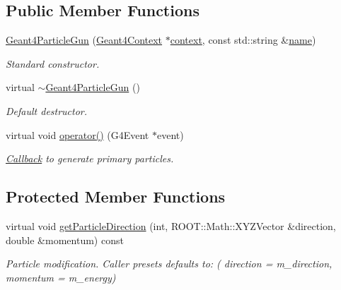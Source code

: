 \subsection*{Public Member Functions}
\begin{DoxyCompactItemize}
\item 
\hyperlink{class_d_d4hep_1_1_simulation_1_1_geant4_particle_gun_ae5bb5f3dd378bc79d03bff0fc723c46d}{Geant4\+Particle\+Gun} (\hyperlink{class_d_d4hep_1_1_simulation_1_1_geant4_context}{Geant4\+Context} $\ast$\hyperlink{class_d_d4hep_1_1_simulation_1_1_geant4_action_aa9d87f0ec2a72b7fc2591b18f98d75cf}{context}, const std\+::string \&\hyperlink{class_d_d4hep_1_1_simulation_1_1_geant4_action_af374e70b014d16afb81dd9d77cc3894b}{name})
\begin{DoxyCompactList}\small\item\em Standard constructor. \end{DoxyCompactList}\item 
virtual \hyperlink{class_d_d4hep_1_1_simulation_1_1_geant4_particle_gun_a96f52fd8078d74c591d410facb13fe21}{$\sim$\+Geant4\+Particle\+Gun} ()
\begin{DoxyCompactList}\small\item\em Default destructor. \end{DoxyCompactList}\item 
virtual void \hyperlink{class_d_d4hep_1_1_simulation_1_1_geant4_particle_gun_a4e68905424d21f2386d24d3cbaf795f1}{operator()} (G4\+Event $\ast$event)
\begin{DoxyCompactList}\small\item\em \hyperlink{class_d_d4hep_1_1_callback}{Callback} to generate primary particles. \end{DoxyCompactList}\end{DoxyCompactItemize}
\subsection*{Protected Member Functions}
\begin{DoxyCompactItemize}
\item 
virtual void \hyperlink{class_d_d4hep_1_1_simulation_1_1_geant4_particle_gun_a442d44c1db6bfe109a1c129859900e55}{get\+Particle\+Direction} (int, R\+O\+O\+T\+::\+Math\+::\+X\+Y\+Z\+Vector \&direction, double \&momentum) const
\begin{DoxyCompactList}\small\item\em Particle modification. Caller presets defaults to\+: ( direction = m\+\_\+direction, momentum = m\+\_\+energy) \end{DoxyCompactList}\end{DoxyCompactItemize}
